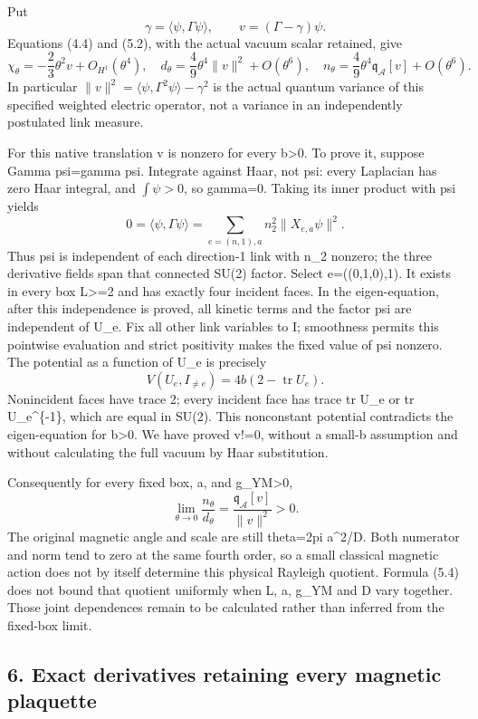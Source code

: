 \documentclass[
  11pt,
]{article}
\begin{document}
Put \[
 \gamma=\langle\psi,\Gamma\psi\rangle,\qquad
 v=(\Gamma-\gamma)\psi.
\] Equations (4.4) and (5.2), with the actual vacuum scalar retained,
give \[
 \chi_\theta=-\frac23\theta^2v+O_{H^1}(\theta^4),
\quad d_\theta=\frac49\theta^4\|v\|^2+O(\theta^6),
\quad n_\theta=\frac49\theta^4\mathfrak q_{\mathcal A}[v]
                         +O(\theta^6).
\tag{5.3}
\] In particular \(\|v\|^2=\langle\psi,\Gamma^2\psi\rangle-\gamma^2\) is
the actual quantum variance of this specified weighted electric
operator, not a variance in an independently postulated link measure.

For this native translation v is nonzero for every b\textgreater0. To
prove it, suppose Gamma psi=gamma psi. Integrate against Haar, not psi:
every Laplacian has zero Haar integral, and \(\int\psi>0\), so gamma=0.
Taking its inner product with psi yields \[
 0=\langle\psi,\Gamma\psi\rangle
   =\sum_{e=(n,1),a}n_2^2\|X_{e,a}\psi\|^2.
\] Thus psi is independent of each direction-1 link with n\_2 nonzero;
the three derivative fields span that connected SU(2) factor. Select
e=((0,1,0),1). It exists in every box L\textgreater=2 and has exactly
four incident faces. In the eigen-equation, after this independence is
proved, all kinetic terms and the factor psi are independent of U\_e.
Fix all other link variables to I; smoothness permits this pointwise
evaluation and strict positivity makes the fixed value of psi nonzero.
The potential as a function of U\_e is precisely \[
 V(U_e,I_{\ne e})=4b(2-\operatorname{tr}U_e).
\] Nonincident faces have trace 2; every incident face has trace tr U\_e
or tr U\_e\^{}\{-1\}, which are equal in SU(2). This nonconstant
potential contradicts the eigen-equation for b\textgreater0. We have
proved v!=0, without a small-b assumption and without calculating the
full vacuum by Haar substitution.

Consequently for every fixed box, a, and g\_YM\textgreater0, \[
 \lim_{\theta\to0}\frac{n_\theta}{d_\theta}
 =\frac{\mathfrak q_{\mathcal A}[v]}{\|v\|^2}>0.
\tag{5.4}
\] The original magnetic angle and scale are still theta=2pi a\^{}2/D.
Both numerator and norm tend to zero at the same fourth order, so a
small classical magnetic action does not by itself determine this
physical Rayleigh quotient. Formula (5.4) does not bound that quotient
uniformly when L, a, g\_YM and D vary together. Those joint dependences
remain to be calculated rather than inferred from the fixed-box limit.

\subsection{6. Exact derivatives retaining every magnetic
plaquette}\label{magnetic-part-1-exact-derivatives-retaining-every-magnetic-plaquette}
\end{document}
